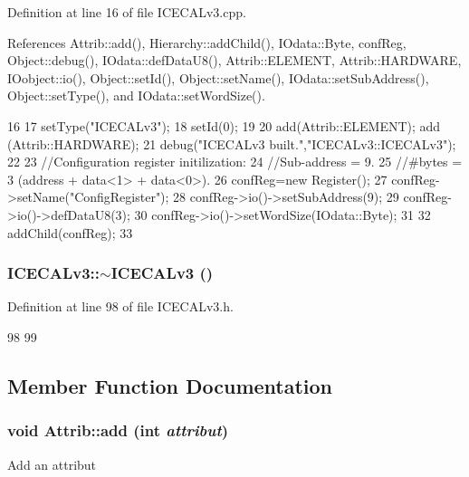 Definition at line 16 of file ICECALv3.cpp.

References Attrib::add(), Hierarchy::addChild(), IOdata::Byte, confReg, Object::debug(), IOdata::defDataU8(), Attrib::ELEMENT, Attrib::HARDWARE, IOobject::io(), Object::setId(), Object::setName(), IOdata::setSubAddress(), Object::setType(), and IOdata::setWordSize().


\begin{DoxyCode}
16                   {
17     setType("ICECALv3");
18     setId(0);
19 
20     add(Attrib::ELEMENT); add (Attrib::HARDWARE);
21     debug("ICECALv3 built.","ICECALv3::ICECALv3");
22 
23     //Configuration register initilization:
24     //Sub-address = 9.
25     //#bytes = 3 (address + data<1> + data<0>).
26     confReg=new Register();
27     confReg->setName("ConfigRegister");
28     confReg->io()->setSubAddress(9);    
29     confReg->io()->defDataU8(3);    
30     confReg->io()->setWordSize(IOdata::Byte);
31 
32     addChild(confReg);  
33 }
\end{DoxyCode}
\hypertarget{classICECALv3_acdadf9483fc38a615192de41548024a1}{
\subsubsection[{$\sim$ICECALv3}]{\setlength{\rightskip}{0pt plus 5cm}ICECALv3::$\sim$ICECALv3 ()}}
\label{classICECALv3_acdadf9483fc38a615192de41548024a1}


Definition at line 98 of file ICECALv3.h.


\begin{DoxyCode}
98              {
99   }
\end{DoxyCode}


\subsection{Member Function Documentation}
\hypertarget{classAttrib_a235f773af19c900264a190b00a3b4ad7}{
\subsubsection[{add}]{\setlength{\rightskip}{0pt plus 5cm}void Attrib::add (int {\em attribut})}}
\label{classAttrib_a235f773af19c900264a190b00a3b4ad7}
Add an attribut 

